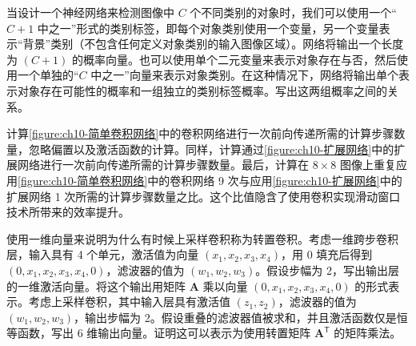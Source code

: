 \documentclass[../../main.tex]{subfiles}
\begin{document}
\begin{exercise}[$\star\star$]\label{exercise:ch10-11}
当设计一个神经网络来检测图像中 $C$ 个不同类别的对象时，我们可以使用一个“$C+1$ 中之一”形式的类别标签，即每个对象类别使用一个变量，另一个变量表示“背景”类别（不包含任何定义对象类别的输入图像区域）。网络将输出一个长度为 $(C+1)$ 的概率向量。也可以使用单个二元变量来表示对象存在与否，然后使用一个单独的“$C$ 中之一”向量来表示对象类别。在这种情况下，网络将输出单个表示对象存在可能性的概率和一组独立的类别标签概率。写出这两组概率之间的关系。
\end{exercise}

\begin{exercise}[$\star\star$]\label{exercise:ch10-12}
计算\cref{figure:ch10-简单卷积网络}中的卷积网络进行一次前向传递所需的计算步骤数量，忽略偏置以及激活函数的计算。同样，计算通过\cref{figure:ch10-扩展网络}中的扩展网络进行一次前向传递所需的计算步骤数量。最后，计算在 $8\times8$ 图像上重复应用\cref{figure:ch10-简单卷积网络}中的卷积网络 9 次与应用\cref{figure:ch10-扩展网络}中的扩展网络 1 次所需的计算步骤数量之比。这个比值隐含了使用卷积实现滑动窗口技术所带来的效率提升。
\end{exercise}

\begin{exercise}[$\star\star$]\label{exercise:ch10-13}
使用一维向量来说明为什么有时候上采样卷积称为转置卷积。考虑一维跨步卷积层，输入具有 4 个单元，激活值为向量 $(x_1,x_2,x_3,x_4)$，用 0 填充后得到 $(0,x_1,x_2,x_3,x_4,0)$，滤波器的值为 $(w_1,w_2,w_3)$。假设步幅为 2，写出输出层的一维激活向量。将这个输出用矩阵 $\mathbf{A}$ 乘以向量 $(0,x_1,x_2,x_3,x_4,0)$ 的形式表示。考虑上采样卷积，其中输入层具有激活值 $(z_1,z_2)$，滤波器的值为 $(w_1,w_2,w_3)$，输出步幅为 2。假设重叠的滤波器值被求和，并且激活函数仅是恒等函数，写出 6 维输出向量。证明这可以表示为使用转置矩阵 $\mathbf{A}^{\mathsf{T}}$ 的矩阵乘法。
\end{exercise}
\end{document}
